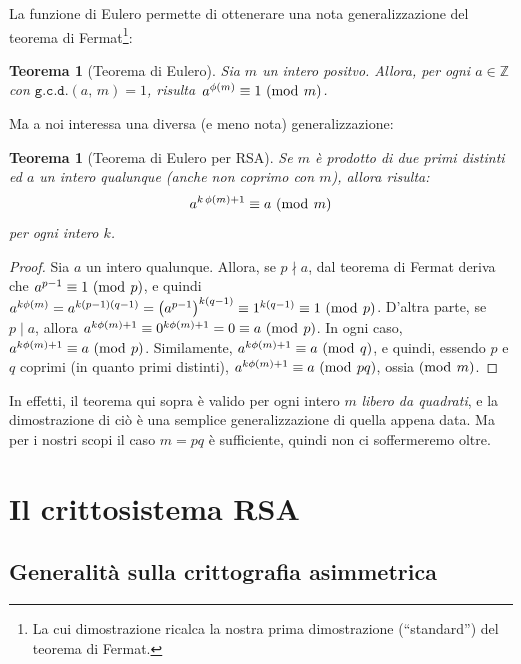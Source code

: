 \documentclass[pdflatex,11pt,a4paper,oneside]{article}
\newcommand{\p}[1]{\left({#1}\right)}
\newcommand{\ephi}[1]{\ensuremath{\phi\p{#1}}}
\newcommand{\Z}[0]{\mathbb{Z}}
\newcommand{\divides}[0]{\mid}
\newcommand{\notdivides}[0]{\nmid}
\newcommand{\congruent}[0]{\equiv}
\newcommand{\mmodop}[0]{\ensuremath{\operatorname{mod}}}
\newcommand{\mmod}[1]{\ensuremath{\allowbreak\ (\mmodop\:{#1})}}
\newcommand{\gcdop}[0]{\ensuremath{\mathtt{g.c.d.}}}
\newcommand{\xgcd}[1]{\ensuremath{\gcdop\left({#1}\right)}}
\renewcommand{\gcd}[2]{\xgcd{{#1},\,{#2}}}
\newtheorem{theorem}[TheoremLike]{Teorema}
\begin{document}
La funzione di Eulero permette di ottenerare una nota generalizzazione
del teorema di Fermat\footnote{La cui dimostrazione ricalca la nostra
prima dimostrazione (``standard'') del teorema di Fermat.}:

\begin{theorem}[Teorema di Eulero]\label{thm:euler}
  Sia $m$ un intero positvo. Allora, per ogni $a \in \Z$ con
  $\gcd{a}{m} = 1$, risulta\, $a^{\ephi{m}} \congruent 1 \mmod m$.
\end{theorem}

\noindent
Ma a noi interessa una diversa (e meno nota) generalizzazione:

\begin{theorem}[Teorema di Eulero per RSA]\label{thm:euler-rsa}
Se $m$ \`e prodotto di due primi \emph{distinti} ed $a$ un intero
qualunque (anche non coprimo con $m$), allora risulta:
  $$ a^{k\,\ephi{m} + 1} \congruent a \mmod m $$
per ogni intero $k$.
\end{theorem}
%
\begin{proof}
Sia $a$ un intero qualunque.  Allora, se $p \notdivides a$, dal teorema
di Fermat deriva che $a^{p-1} \congruent 1 \mmod p$, e quindi
$a^{k\ephi{m}} = a^{k(p-1)(q-1)} = {\p{a^{p-1}}}^{k(q-1)} \congruent
1^{k(q-1)} \congruent 1 \mmod p$.  D'altra parte, se $p \divides a$,
allora $a^{k\ephi{m} + 1} \congruent 0^{k\ephi{m} + 1} = 0 \congruent a
\mmod p$. In ogni caso, $a^{k\ephi{m} + 1} \congruent a \mmod p$.
Similamente, $a^{k\ephi{m} + 1} \congruent a \mmod q$, e quindi, essendo
$p$ e $q$ coprimi (in quanto primi distinti), $a^{k\ephi{m} + 1}
\congruent a \mmod{pq}$,
ossia$\mmod m$. %
\end{proof}

In effetti, il teorema qui sopra \`e valido per ogni intero $m$
\emph{libero da quadrati}, e la dimostrazione di ci\`o \`e una
semplice generalizzazione di quella appena data.  Ma per i nostri
scopi il caso $m = pq$ \`e sufficiente, quindi non ci soffermeremo
oltre.


\section{Il crittosistema RSA}

\subsection{Generalit\`a sulla crittografia asimmetrica}
\end{document}
